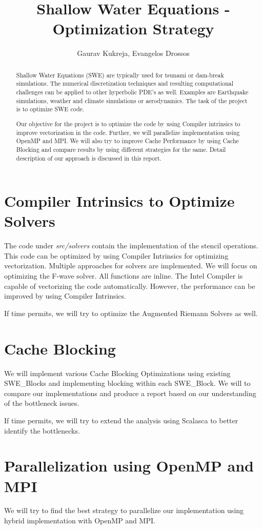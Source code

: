\documentclass[]{article}
\title{Shallow Water Equations - Optimization Strategy}
\author{Gaurav Kukreja, Evangelos Drossos}
\begin{document}
\maketitle

\begin{abstract}
Shallow Water Equations (SWE) are typically used for tsunami or dam-break simulations.
The numerical discretization techniques and resulting computational challenges can be
applied to other hyperbolic PDE's as well. Examples are Earthquake simulations,
weather and climate simulations or aerodynamics. The task of the project is to optimize
SWE code. 

Our objective for the project is to optimize the code by using Compiler intrinsics to
improve vectorization in the code. Further, we will parallelize implementation using
OpenMP and MPI. We will also try to improve Cache Performance by using Cache Blocking
and compare results by using different strategies for the same. Detail description of
our approach is discussed in this report.
\end{abstract}

\section{Compiler Intrinsics to Optimize Solvers}
The code under \textit{src/solvers} contain the implementation of the stencil operations.
This code can be optimized by using Compiler Intrinsics for optimizing vectorization.
Multiple approaches for solvers are implemented. We will focus on optimizing the 
F-wave solver. All functions are inline. The Intel Compiler is capable of vectorizing
the code automatically. However, the performance can be improved by using Compiler
Intrinsics.

If time permits, we will try to optimize the Augmented Riemann Solvers as well.

\section{Cache Blocking}
We will implement various Cache Blocking Optimizations using existing SWE\_Blocks and
implementing blocking within each SWE\_Block. We will to compare our implementations and
produce a report based on our understanding of the bottleneck issues.

If time permits, we will try to extend the analysis using Scalasca to better identify
the bottlenecks.

\section{Parallelization using OpenMP and MPI}
We will try to find the best strategy to parallelize our implementation using hybrid
implementation with OpenMP and MPI. 
\end{document}
